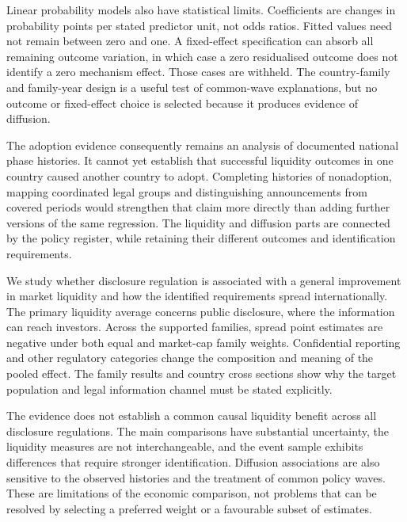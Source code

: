 \documentclass[12pt,letterpaper]{article}
\makeatletter
\renewcommand{\section}{\@startsection{section}{1}{\z@}{-3.5ex plus -1ex minus -.2ex}{2.3ex plus .2ex}{\centering\normalfont\normalsize\bfseries}}
\makeatother
\begin{document}
Linear probability models also have statistical limits. Coefficients are changes in probability points per stated predictor unit, not odds ratios. Fitted values need not remain between zero and one. A fixed-effect specification can absorb all remaining outcome variation, in which case a zero residualised outcome does not identify a zero mechanism effect. Those cases are withheld. The country-family and family-year design is a useful test of common-wave explanations, but no outcome or fixed-effect choice is selected because it produces evidence of diffusion.


The adoption evidence consequently remains an analysis of documented national phase histories. It cannot yet establish that successful liquidity outcomes in one country caused another country to adopt. Completing histories of nonadoption, mapping coordinated legal groups and distinguishing announcements from covered periods would strengthen that claim more directly than adding further versions of the same regression. The liquidity and diffusion parts are connected by the policy register, while retaining their different outcomes and identification requirements.


\clearpage

\section{CONCLUSION}

We study whether disclosure regulation is associated with a general improvement in market liquidity and how the identified requirements spread internationally. The primary liquidity average concerns public disclosure, where the information can reach investors. Across the supported families, spread point estimates are negative under both equal and market-cap family weights. Confidential reporting and other regulatory categories change the composition and meaning of the pooled effect. The family results and country cross sections show why the target population and legal information channel must be stated explicitly.


The evidence does not establish a common causal liquidity benefit across all disclosure regulations. The main comparisons have substantial uncertainty, the liquidity measures are not interchangeable, and the event sample exhibits differences that require stronger identification. Diffusion associations are also sensitive to the observed histories and the treatment of common policy waves. These are limitations of the economic comparison, not problems that can be resolved by selecting a preferred weight or a favourable subset of estimates.
\end{document}
